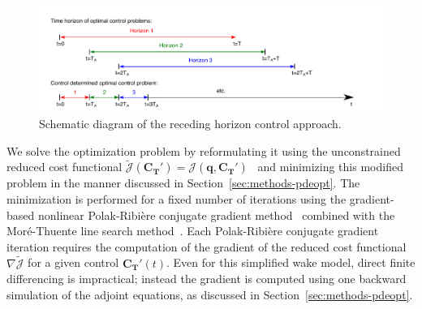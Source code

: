 \begin{figure}[t]
\centering
\includegraphics[width=\textwidth]{./fig/receding_horizon.pdf}
\caption{Schematic diagram of the receding horizon control approach.}
\label{fig:receding_horizon}
\end{figure}

We solve the optimization problem by reformulating it using the unconstrained reduced cost functional $\tilde{\mathcal{J}}(\mathbf{C_T'}) = \mathcal{J}(\mathbf{q},\mathbf{C_T'})$~\cite{Bewley2001a, Goit2015a} and minimizing this modified problem in the manner discussed in Section~\ref{sec:methods-pdeopt}. The minimization is performed for a fixed number of iterations using the gradient-based nonlinear Polak-Ribi\`{e}re conjugate gradient method~\cite{Press2007a} combined with the Mor\'{e}-Thuente line search method~\cite{More1994a}. Each Polak-Ribi\`{e}re conjugate gradient iteration requires the computation of the gradient of the reduced cost functional $\nabla\tilde{\mathcal{J}}$ for a given control $\mathbf{C_T'}(t)$. Even for this simplified wake model, direct finite differencing is impractical; instead the gradient is computed using one backward simulation of the adjoint equations, as discussed in Section~\ref{sec:methods-pdeopt}.

